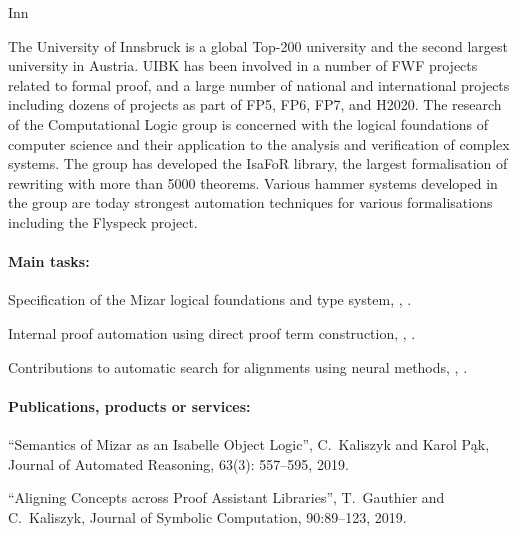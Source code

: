 \begin{sitedescription}{Inn}

The University of Innsbruck is a global Top-200 university and the second
largest university in Austria. UIBK has been involved in a number of FWF
projects related to formal proof, and a large number of national and
international projects including dozens of projects as part of FP5,
FP6, FP7, and H2020.
%
The research of the Computational Logic group is concerned with the logical
foundations of computer science and their application to the analysis and
verification of complex systems. The group has developed the IsaFoR library,
the largest formalisation of rewriting with more than 5000 theorems. Various
hammer systems developed in the group are today strongest automation techniques
for various formalisations including the Flyspeck project.

\paragraph*{Main tasks:}

\begin{compactitem}
\item Specification of the Mizar logical foundations and type system, , .
\item Internal proof automation using direct proof term construction, %
  , .
\item Contributions to automatic search for alignments using neural methods, , .
\end{compactitem}

\paragraph*{Publications, products or services:}

\begin{compactitem}
\item ``Semantics of Mizar as an Isabelle Object Logic'', C.~Kaliszyk and Karol Pąk, Journal of Automated Reasoning, 63(3): 557--595, 2019.

\item ``Aligning Concepts across Proof Assistant Libraries'', T.~Gauthier and C.~Kaliszyk, Journal of Symbolic Computation, 90:89--123, 2019.


\end{compactitem}
\end{sitedescription}
